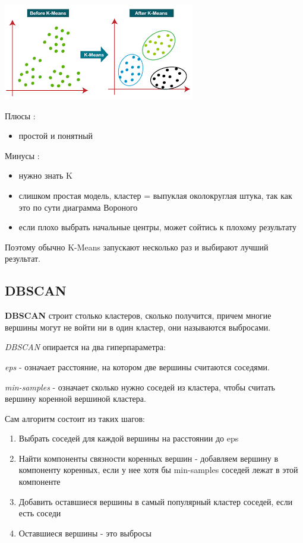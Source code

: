 \begin{center}
    \includegraphics[scale=1]{tickets/pictures/k_means.png}
\end{center}

Плюсы :
\begin{itemize}
    \item простой и понятный
\end{itemize}

Минусы :
\begin{itemize}
    \item нужно знать K
    \item слишком простая модель, кластер = выпуклая околокруглая штука, так как это по сути диаграмма Вороного
    \item если плохо выбрать начальные центры, может сойтись к плохому результату
\end{itemize}

Поэтому обычно K-Means запускают несколько раз и выбирают лучший результат.

\subsection{DBSCAN}

\textbf{DBSCAN} строит столько кластеров, сколько получится, причем многие вершины могут не войти ни в один кластер, они называются выбросами.

\textit{DBSCAN} опирается на два гиперпараметра:

\textit{eps} - означает расстояние, на котором две вершины считаются соседями.
 
\textit{min-samples} - означает сколько нужно соседей из кластера, чтобы считать вершину коренной вершиной кластера.

Сам алгоритм состоит из таких шагов:
\begin{enumerate}
    \item Выбрать соседей для каждой вершины на расстоянии до eps
    \item Найти компоненты связности коренных вершин - добавляем вершину в компоненту коренных, если у нее хотя бы min-samples соседей лежат в этой компоненте
    \item Добавить оставшиеся вершины в самый популярный кластер соседей, если есть соседи
    \item Оставшиеся вершины - это выбросы
\end{enumerate}


